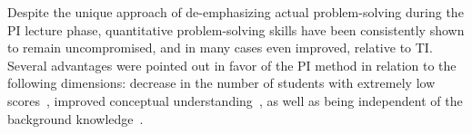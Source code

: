 \documentclass[twocolumn,secnumarabic,amssymb, nobibnotes, aps, prd]{revtex4-2}
\begin{document}
    Despite the unique approach of de-emphasizing actual problem-solving during the PI lecture phase, quantitative problem-solving skills have been consistently shown to remain uncompromised, and in many cases even improved, relative to TI.
    Several advantages were pointed out in favor of the PI method in relation to the following dimensions: decrease in the number of students with extremely low scores~\cite{crouch2001peer,lasry2008peer,thacker1994comparing}, improved conceptual understanding~\cite{crouch2001peer}, as well as being independent of the background knowledge~\cite{lasry2008peer,tobias1990they}.



\end{document}
